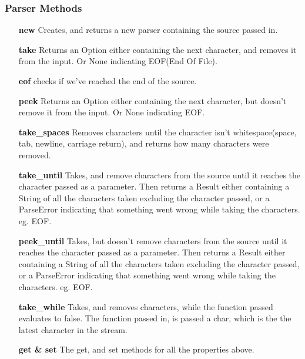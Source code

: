\subsubsection{Parser Methods}
\begin{itemize}
    
    \item[\textbf{new}] Creates, and returns a new parser containing the source passed in.
    
    \item[\textbf{take}] Returns an Option either containing the next character, and removes it from the input. Or None indicating EOF(End Of File).
    
    \item[\textbf{eof}] checks if we've reached the end of the source.
    
    \item[\textbf{peek}] Returns an Option either containing the next character, but doesn't remove it from the input. Or None indicating EOF.

    \item[\textbf{take\_spaces}] Removes characters until the character isn't whitespace(space, tab, newline, carriage return), and returns how many characters were removed.

    \item[\textbf{take\_until}] Takes, and remove characters from the source until it reaches the character passed as a parameter. Then returns a Result either containing a String of all the characters taken excluding the character passed, or a ParseError indicating that something went wrong while taking the characters. eg. EOF.

    \item[\textbf{peek\_until}] Takes, but doesn't remove characters from the source until it reaches the character passed as a parameter. Then returns a Result either containing a String of all the characters taken excluding the character passed, or a ParseError indicating that something went wrong while taking the characters. eg. EOF.
    
    \item[\textbf{take\_while}] Takes, and removes characters, while the function passed evaluates to false. The function passed in, is passed a char, which is the the latest character in the stream.
    
    \item[\textbf{get \& set}] The get, and set methods for all the properties above.
\end{itemize}

